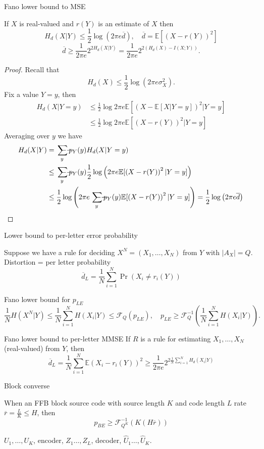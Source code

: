 \documentclass{report}
\newcommand{\matE}{\mathbb{E}}
\def \ssumsym {\mathrlap{\ \ --}\sum}
\DeclareMathOperator*{\ssum}{\ssumsym}
\theoremstyle{definition}
\theoremstyle{remark}
\numberwithin{equation}{section}
\begin{document}
Fano lower bound to MSE

If $X$ is real-valued and $r(Y)$ is an estimate of $X$ then \[
  H_d(X|Y) \leq \frac{1}{2}\log(2\pi e \overline{d}),  \quad \overline{d} = \matE[(X - r(Y))^2]  
  \]\[\overline{d} \geq \frac{1}{2\pi e}2^{2H_d(X|Y)} = \frac{1}{2\pi e}2^{2(H_d(X) - I(X;Y))}.\]

\begin{proof}
  Recall that \[H_d(X) \leq \frac{1}{2}\log (2\pi e \sigma_X^2).\]
  Fix a value $Y = y$, then
  \begin{align*}
    H_d(X|Y = y) & \leq \frac{1}{2} \log 2\pi e \matE[\left(X - \matE[X| Y = y]\right)^2 | Y = y] \\
    & \leq \frac{1}{2} \log 2\pi e \matE[\left(X - r(Y)\right)^2 | Y = y]
  \end{align*}
  Averaging over $y$ we have \begin{align*}
    H_d(X|Y) & = \ssum_y p_Y(y)H_d(X|Y = y) \\
    & \leq \ssum_y p_Y(y)\frac{1}{2}\log\left(2\pi e \matE[\left(X - r(Y)\right)^2 | Y = y]\right) \\
    & \leq \frac{1}{2}\log\left(2\pi e \ssum_y p_Y(y)\matE[\left(X - r(Y)\right)^2 | Y = y]\right) = \frac{1}{2}\log\left(2\pi e \overline{d}\right) \qedhere
  \end{align*}
\end{proof}

Lower bound to per-letter error probability

Suppose we have a rule for deciding $X^N = (X_1, \ldots, X_N)$ from $Y$ with $|A_X| = Q$. 
Distortion = per letter probability \[\overline{d}_L = \frac{1}{N}\sum_{i=1}^N \Pr(X_i \neq r_i(Y))\]

Fano lower bound for $p_{LE}$ \[
\frac{1}{N}H(X^N|Y) \leq \frac{1}{N}\sum_{i=1}^N H(X_i|Y) \leq \mathscr{F}_Q(p_{LE}),\quad p_{LE} \geq \mathscr{F}_Q^{-1}\left(\frac{1}{N}\sum_{i=1}^N H(X_i|Y)\right).
\]

Fano lower bound to per-letter MMSE
If $R$ is a rule for estimating $X_1, \ldots, X_N$ (real-valued) from $Y$, then \[
\overline{d}_L = \frac{1}{N}\sum_{i=1}^N \matE(X_i - r_i(Y))^2 \geq \frac{1}{2\pi e}2^{2\frac{1}{N}\sum_{i=1}^N H_d(X_i|Y)}  
\]

Block converse

When an FFB block source code with source length $K$ and code length $L$ rate $\overline{r} = \frac{L}{K} \leq H$, then \[p_{BE} \geq \mathscr{F}_{Q^K}^{-1}(K(H\overline{r}))\]

$U_1, \ldots, U_K$, encoder, $Z_1 \ldots, Z_L$, decoder, $\hat{U}_1 \ldots, \hat{U}_K$.
\end{document}
